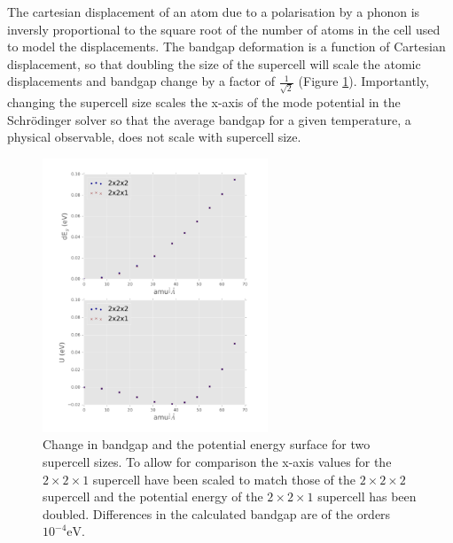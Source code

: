 
The cartesian displacement of an atom due to a polarisation by a phonon is inversly proportional to the square root of the number of atoms in the cell used to model the displacements.\autocite{Whalley2016} The bandgap deformation is a function of Cartesian displacement, so that doubling the size of the supercell will scale the atomic displacements and bandgap change by a factor of $\frac{1}{\sqrt{2}}$ (Figure \ref{ch5scaling}). 
Importantly, changing the supercell size scales the x-axis of the mode potential in the Schr\"{o}dinger solver so that the average bandgap for a given temperature, a physical observable, does not scale with supercell size.

\begin{figure}[h!]
\includegraphics[width=0.6\textwidth]{figures/ch5/SCcompare.png} \centering
\caption[Bandgap deformation potential and supercell size]{\label{ch5scaling}
Change in bandgap and the potential energy surface for two supercell sizes. To allow for comparison the x-axis values for the $2\times2\times1$ supercell have been scaled to match those of the $2\times2\times2$ supercell and the potential energy of the $2\times2\times1$ supercell has been doubled.  Differences in the calculated bandgap are of the orders $10^{-4}\textrm{eV}$.
}
\end{figure}

